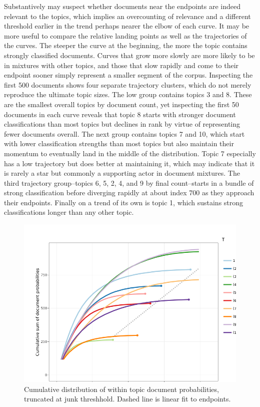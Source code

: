 \documentclass[]{book}
\theoremstyle{definition}
\theoremstyle{definition}
\theoremstyle{definition}
\theoremstyle{remark}
\begin{document}
Substantively may suspect whether documents near the endpoints are
indeed relevant to the topics, which implies an overcounting of
relevance and a different threshold earlier in the trend perhaps nearer
the elbow of each curve. It may be more useful to compare the relative
landing points as well as the trajectories of the curves. The steeper
the curve at the beginning, the more the topic contains strongly
classified documents. Curves that grow more slowly are more likely to be
in mixtures with other topics, and those that slow rapidly and come to
their endpoint sooner simply represent a smaller segment of the corpus.
Inspecting the first 500 documents shows four separate trajectory
clusters, which do not merely reproduce the ultimate topic sizes. The
low group contains topics 3 and 8. These are the smallest overall topics
by document count, yet inspecting the first 50 documents in each curve
reveals that topic 8 starts with stronger document classifications than
most topics but declines in rank by virtue of representing fewer
documents overall. The next group contains topics 7 and 10, which start
with lower classification strengths than most topics but also maintain
their momentum to eventually land in the middle of the distribution.
Topic 7 especially has a low trajectory but does better at maintaining
it, which may indicate that it is rarely a star but commonly a
supporting actor in document mixtures. The third trajectory
group--topics 6, 5, 2, 4, and 9 by final count--starts in a bundle of
strong classification before diverging rapidly at about index 700 as
they approach their endpoints. Finally on a trend of its own is topic 1,
which sustains strong classifications longer than any other topic.

\begin{figure}

{\centering \includegraphics[width=0.9\linewidth]{03_files/figure-latex/elbow2-1} 

}

\caption{Cumulative distribution of within topic document probabilities, truncated at junk threshhold. Dashed line is linear fit to endpoints.}\label{fig:elbow2}
\end{figure}
\end{document}
